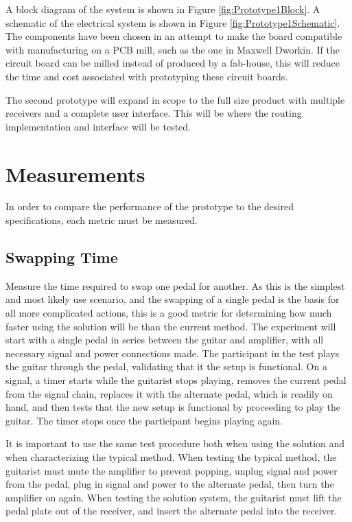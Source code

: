 \documentclass{article}
\begin{document}
	A block diagram of the system is shown in Figure \ref{fig:Prototype1Block}.  A schematic of the electrical system is shown in Figure \ref{fig:Prototype1Schematic}.  The components have been chosen in an attempt to make the board compatible with manufacturing on a PCB mill, such as the one in Maxwell Dworkin.  If the circuit board can be milled instead of produced by a fab-house, this will reduce the time and cost associated with prototyping these circuit boards.

	The second prototype will expand in scope to the full size product with multiple receivers and a complete user interface.  This will be where the routing implementation and interface will be tested.


\section{Measurements}
	In order to compare the performance of the prototype to the desired specifications, each metric must be measured.

	\subsection{Swapping Time}
	Measure the time required to swap one pedal for another.  As this is the simplest and most likely use scenario, and the swapping of a single pedal is the basis for all more complicated actions, this is a good metric for determining how much faster using the solution will be than the current method.  The experiment will start with a single pedal in series between the guitar and amplifier, with all necessary signal and power connections made.  The participant in the test plays the guitar through the pedal, validating that it the setup is functional.  On a signal, a timer starts while the guitarist stops playing, removes the current pedal from the signal chain, replaces it with the alternate pedal, which is readily on hand, and then tests that the new setup is functional by proceeding to play the guitar.  The timer stops once the participant begins playing again.

	It is important to use the same test procedure both when using the solution and when characterizing the typical method.  When testing the typical method, the guitarist must mute the amplifier to prevent popping, unplug signal and power from the pedal, plug in signal and power to the alternate pedal, then turn the amplifier on again.  When testing the solution system, the guitarist must lift the pedal plate out of the receiver, and insert the alternate pedal into the receiver.
\end{document}
